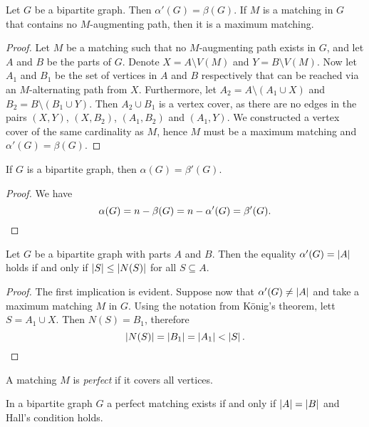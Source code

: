 \begin{izrek}[König]
Let $G$ be a bipartite graph. Then $\alpha'(G) = \beta(G)$. If $M$
is a matching in $G$ that contains no $M$-augmenting path, then it
is a maximum matching.
\end{izrek}

\begin{proof}
Let $M$ be a matching such that no $M$-augmenting path exists in
$G$, and let $A$ and $B$ be the parts of $G$. Denote
$X = A \setminus V(M)$ and $Y = B \setminus V(M)$. Now let $A_1$
and $B_1$ be the set of vertices in $A$ and $B$ respectively that
can be reached via an $M$-alternating path from $X$. Furthermore,
let $A_2 = A \setminus (A_1 \cup X)$ and
$B_2 = B \setminus (B_1 \cup Y)$. Then $A_2 \cup B_1$ is a vertex
cover, as there are no edges in the pairs $(X, Y)$, $(X, B_2)$,
$(A_1, B_2)$ and $(A_1, Y)$. We constructed a vertex cover of the
same cardinality as $M$, hence $M$ must be a maximum matching and
$\alpha'(G) = \beta(G)$.
\end{proof}

\begin{posledica}
If $G$ is a bipartite graph, then $\alpha(G) = \beta'(G)$.
\end{posledica}

\begin{proof}
We have
\[
\alpha(G) = n - \beta(G) = n - \alpha'(G) = \beta'(G). \qedhere
\]
\end{proof}

\begin{izrek}[Hall]
Let $G$ be a bipartite graph with parts $A$ and $B$. Then the
equality $\alpha'(G) = \left\lvert A\right\rvert$ holds if and only if
$\left\lvert S\right\rvert \leq \left\lvert N(S)\right\rvert$ for all $S \subseteq A$.
\end{izrek}

\begin{proof}
The first implication is evident. Suppose now that
$\alpha'(G) \ne \left\lvert A\right\rvert$ and take a maximum matching $M$ in $G$.
Using the notation from König's theorem, lett $S = A_1 \cup X$.
Then $N(S) = B_1$, therefore
\[
\left\lvert N(S)\right\rvert = \left\lvert B_1\right\rvert = \left\lvert A_1\right\rvert < \left\lvert S\right\rvert. \qedhere
\]
\end{proof}

\begin{definicija}
A matching $M$ is \emph{perfect} if it
covers all vertices.
\end{definicija}

\begin{posledica}
In a bipartite graph $G$ a perfect matching exists if and only if
$\left\lvert A\right\rvert = \left\lvert B\right\rvert$ and Hall's condition holds.
\end{posledica}

